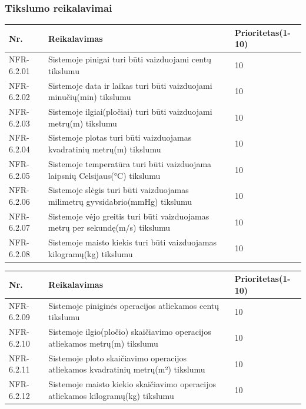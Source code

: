 \documentclass[oneside]{VUMIFPSkursinis}
\begin{document}
\subsubsection{Tikslumo reikalavimai}
\centering
{}
\begin{table}[htbp]
	\begin{tabularx}{1\textwidth}{ |P{2.5cm}|X|P{3cm }| }  \hline
		Nr. & Reikalavimas & Prioritetas(1-10) \\ \hline
		NFR-6.2.01 & Sistemoje pinigai turi būti vaizduojami centų tikslumu & 10 \\ \hline
		NFR-6.2.02 & Sistemoje data ir laikas turi būti vaizduojami minučių(min) tikslumu & 10 \\ \hline
		NFR-6.2.03 & Sistemoje ilgiai(pločiai) turi būti vaizduojami metrų(m) tikslumu & 10 \\ \hline
		NFR-6.2.04 & Sistemoje plotas turi būti vaizduojamas kvadratinių metrų(m) tikslumu & 10 \\ \hline
		NFR-6.2.05 & Sistemoje temperatūra turi būti vaizduojama laipsnių Celsijaus(°C) tikslumu & 10 \\ \hline
		NFR-6.2.06 & Sistemoje slėgis turi būti vaizduojamas milimetrų gyvsidabrio(mmHg) tikslumu & 10 \\ \hline
		NFR-6.2.07 & Sistemoje vėjo greitis turi būti vaizduojamas metrų per sekundę(m/s) tikslumu & 10 \\ \hline
		NFR-6.2.08 & Sistemoje maisto kiekis turi būti vaizduojamas kilogramų(kg) tikslumu & 10 \\ \hline
	\end{tabularx}
\end{table}
\begin{table}[htbp]
	\begin{tabularx}{1\textwidth}{ |P{2.5cm}|X|P{3cm }| }  \hline
		Nr. & Reikalavimas & Prioritetas(1-10) \\ \hline
		NFR-6.2.09 & Sistemoje piniginės operacijos atliekamos centų tikslumu & 10 \\ \hline
		NFR-6.2.10 & Sistemoje ilgio(pločio) skaičiavimo operacijos atliekamos metrų(m) tikslumu & 10 \\ \hline
		NFR-6.2.11 & Sistemoje ploto skaičiavimo operacijos atliekamos kvadratinių metrų(m²) tikslumu & 10 \\ \hline
		NFR-6.2.12 & Sistemoje maisto kiekio skaičiavimo operacijos atliekamos kilogramų(kg) tikslumu & 10 \\ \hline
	\end{tabularx}
\end{table}
\end{document}

